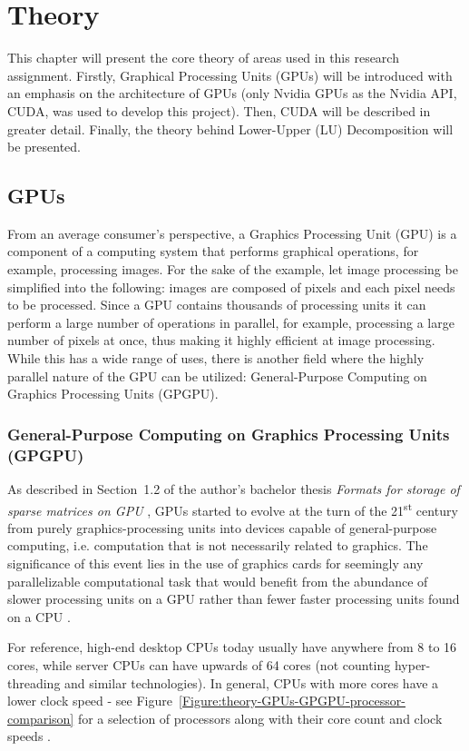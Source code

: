 \chapter{Theory}
This chapter will present the core theory of areas used in this research assignment. Firstly, Graphical Processing Units (GPUs) will be introduced with an emphasis on the architecture of GPUs (only Nvidia GPUs as the Nvidia API, CUDA, was used to develop this project). Then, CUDA will be described in greater detail. Finally, the theory behind Lower-Upper (LU) Decomposition will be presented.

\section{GPUs}
From an average consumer's perspective, a Graphics Processing Unit (GPU) is a component of a computing system that performs graphical operations, for example, processing images. For the sake of the example, let image processing be simplified into the following: images are composed of pixels and each pixel needs to be processed. Since a GPU contains thousands of processing units it can perform a large number of operations in parallel, for example, processing a large number of pixels at once, thus making it highly efficient at image processing. While this has a wide range of uses, there is another field where the highly parallel nature of the GPU can be utilized: General-Purpose Computing on Graphics Processing Units (GPGPU).

\subsection{General-Purpose Computing on Graphics Processing Units (GPGPU)}
As described in Section~1.2 of the author's bachelor thesis \emph{Formats for storage of sparse matrices on GPU} \cite{Cejka2020}, GPUs started to evolve at the turn of the 21\textsuperscript{st} century from purely graphics-processing units into devices capable of general-purpose computing, i.e. computation that is not necessarily related to graphics. The significance of this event lies in the use of graphics cards for seemingly any parallelizable computational task that would benefit from the abundance of slower processing units on a GPU rather than fewer faster processing units found on a CPU \cite{NVIDIAMay2022}.

\par For reference, high-end desktop CPUs today usually have anywhere from 8 to 16 cores, while server CPUs can have upwards of 64 cores (not counting hyper-threading and similar technologies). In general, CPUs with more cores have a lower clock speed - see Figure~\ref{Figure:theory-GPUs-GPGPU-processor-comparison} for a selection of processors along with their core count and clock speeds \cite{Glawion7March2022}.

